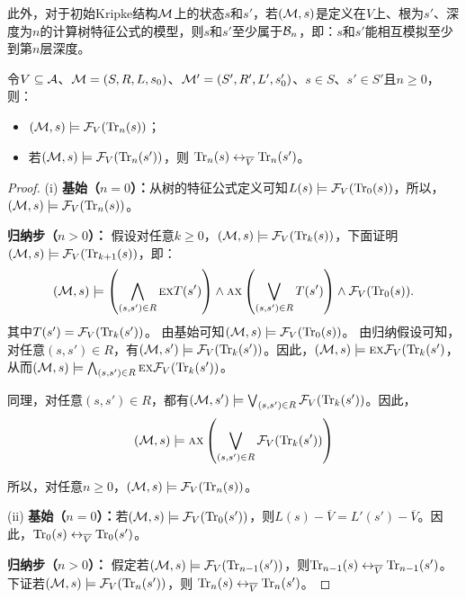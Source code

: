 此外，对于初始Kripke结构${\cal M}$上的状态$s$和$s'$，若$({\cal M},s)$是定义在$V$上、根为$s'$、深度为$n$的计算树特征公式的模型，则$s$和$s'$至少属于${\cal B}_n$，即：$s$和$s'$能相互模拟至少到第$n$层深度。

\begin{lemma}\label{Bn:to:Tn}
	令$V\subseteq {\cal A}$、${\cal M}=(S, R, L,s_0)$、${\cal M}'=(S', R', L',s_0')$、$s\in S$、$s'\in S'$且$n\ge 0$，则：
	\begin{itemize}
		\item[(i)] $({\cal M},s)\models{\cal F}_V(\textrm{Tr}_n(s))$；
		\item[(ii)] 若$({\cal M},s)\models{\cal F}_V(\textrm{Tr}_n(s'))$，则
		$\textrm{Tr}_n(s) \leftrightarrow_{\overline V} \textrm{Tr}_n(s')$。
	\end{itemize}
\end{lemma}
\begin{proof}
	(i) \textbf{基始（$n=0$）：}从树的特征公式定义可知$L(s) \models {\cal F}_V(\textrm{Tr}_0(s))$，所以，$({\cal M},s)\models{\cal F}_V(\textrm{Tr}_n(s))$。
	
	\textbf{归纳步（$n>0$）：} 假设对任意$k\geq 0$，$({\cal M},s)\models{\cal F}_V(\textrm{Tr}_k(s))$，下面证明$({\cal M},s)\models{\cal F}_V(\textrm{Tr}_{k+1}(s))$，即：
	\begin{equation*}
		({\cal M},s)\models \left(\bigwedge_{(s,s')\in R}
		\textsc{e} \textsc{x} T(s')\right)
		\wedge \textsc{a} \textsc{x}\left(\bigvee_{(s,s')\in R}
		T(s')\right)
		\wedge {\cal F}_V(\textrm{Tr}_0(s)).
	\end{equation*}
	其中$T(s') ={\cal F}_V(\textrm{Tr}_k(s'))$。 
	由基始可知$({\cal M},s)\models {\cal F}_V(\textrm{Tr}_0(s))$。
	由归纳假设可知，对任意$(s,s') \in R$，有$({\cal M}, s') \models {\cal F}_V(\textrm{Tr}_k(s'))$。因此，$({\cal M},s)\models \textsc{e} \textsc{x} {\cal F}_V(\textrm{Tr}_k(s')$，从而$({\cal M},s)\models \bigwedge_{(s,s')\in R}
	\textsc{e} \textsc{x} {\cal F}_V(\textrm{Tr}_k(s'))$。
	
	同理，对任意$(s,s') \in R$，都有$({\cal M}, s') \models \bigvee_{(s,s')\in R} {\cal F}_V(\textrm{Tr}_k(s') )$。因此，
	$$({\cal M},s)\models \textsc{a} \textsc{x}\left(\bigvee_{(s,s')\in R}
	{\cal F}_V(\textrm{Tr}_k(s') )\right)$$
	
	所以，对任意$n\geq 0$，$({\cal M},s)\models{\cal F}_V(\textrm{Tr}_n(s))$。
	
	
	
	(ii) \textbf{基始（$n=0$）：}若$({\cal M}, s)  \models {\cal F}_V(\textrm{Tr}_0(s'))$，则$L(s) - \overline V = L'(s') - \overline V$。因此，$\textrm{Tr}_0(s) \leftrightarrow_{\overline V} \textrm{Tr}_0(s')$。
	
	\textbf{归纳步（$n>0$）：} 假定若$({\cal M},s)\models{\cal F}_V(\textrm{Tr}_{n-1}(s'))$，则$\textrm{Tr}_{n-1}(s) \leftrightarrow_{\overline V} \textrm{Tr}_{n-1}(s')$。下证若$({\cal M},s)\models{\cal F}_V(\textrm{Tr}_n(s'))$，则
	$\textrm{Tr}_n(s) \leftrightarrow_{\overline V} \textrm{Tr}_n(s')$。
	

\end{proof}
